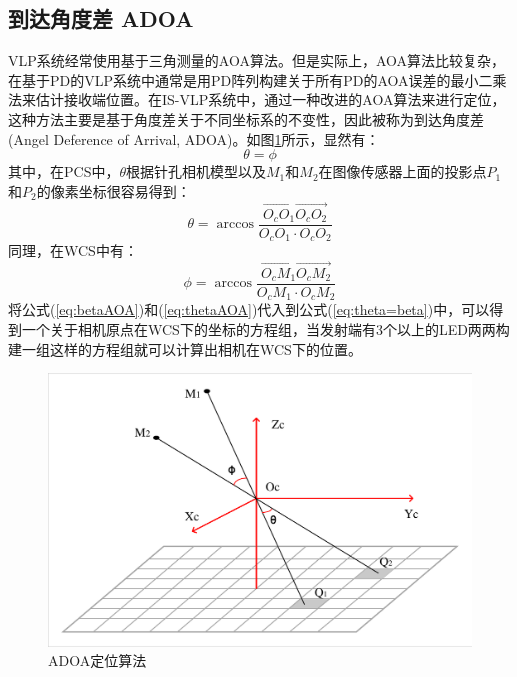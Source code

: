 \subsection{到达角度差 ADOA}
VLP系统经常使用基于三角测量的AOA算法。但是实际上，AOA算法比较复杂，在基于PD的VLP系统中通常是用PD阵列构建关于所有PD的AOA误差的最小二乘法来估计接收端位置。在IS-VLP系统中，通过一种改进的AOA算法来进行定位，这种方法主要是基于角度差关于不同坐标系的不变性，因此被称为到达角度差(Angel Deference of Arrival, ADOA)。如图\ref{fig:AOA}所示，显然有：
\begin{equation}\label{eq:theta=beta}
\theta=\phi
\end{equation}
其中，在PCS中，$\theta$根据针孔相机模型以及$M_1$和$M_2$在图像传感器上面的投影点$P_1$和$P_2$的像素坐标很容易得到：
\begin{equation}\label{eq:thetaAOA}
\theta=\arccos{\frac{\overrightarrow{O_cO_1}\overrightarrow{O_cO_2}}{O_cO_1\cdot O_cO_2}}
\end{equation}
同理，在WCS中有：
\begin{equation}\label{eq:betaAOA}
\phi=\arccos{\frac{\overrightarrow{O_cM_1}\overrightarrow{O_cM_2}}{O_cM_1\cdot O_cM_2}}
\end{equation}
将公式(\ref{eq:betaAOA})和(\ref{eq:thetaAOA})代入到公式(\ref{eq:theta=beta})中，可以得到一个关于相机原点在WCS下的坐标的方程组，当发射端有3个以上的LED两两构建一组这样的方程组就可以计算出相机在WCS下的位置。
\begin{figure}[!htbp]
  \centering
  \includegraphics[width=0.8\linewidth]{FIG/AOA.pdf}
  \caption{ADOA定位算法}
  \label{fig:AOA}
\end{figure}



